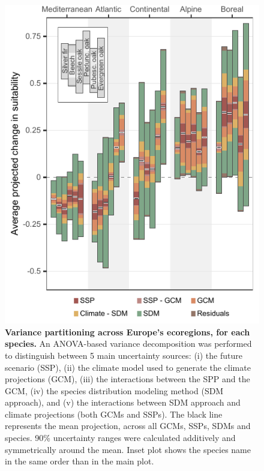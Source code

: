 \begin{figure}
\includegraphics{chapter4/figs/anova_within_species_byecoregion-1.pdf}
\caption{\textbf{Variance partitioning across Europe's ecoregions, for each species.} An ANOVA-based variance decomposition was performed to distinguish between 5 main uncertainty sources: (i) the future scenario (SSP), (ii) the climate model used to generate the climate projections (GCM), (iii) the interactions between the SPP and the GCM, (iv) the species distribution modeling method (SDM approach), and (v) the interactions between SDM approach and climate projections (both GCMs and SSPs). The black line represents the mean projection, across all GCMs, SSPs, SDMs and species. 90\% uncertainty ranges were calculated additively and symmetrically around the mean. Inset plot shows the species name in the same order than in the main plot.}
\label{fig:anovawithinspecies}
\end{figure} 

